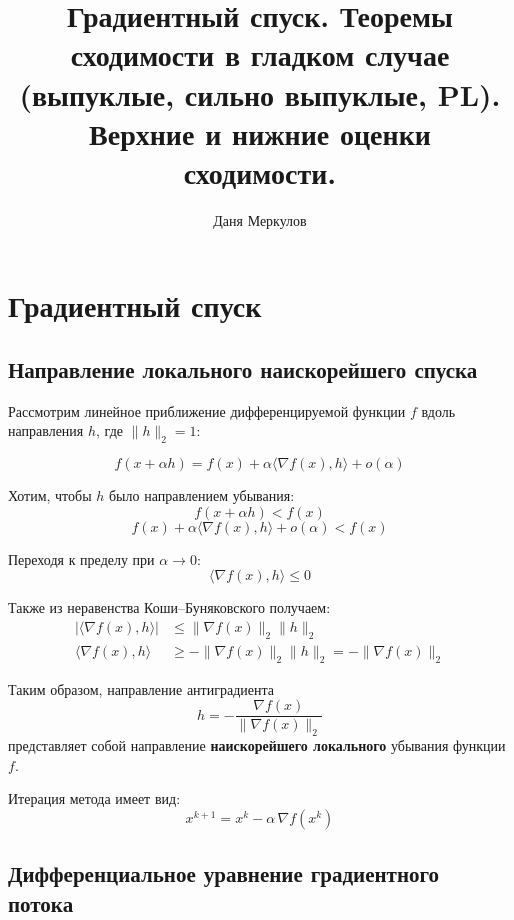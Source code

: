 \documentclass[
  russian,
  letterpaper,
  DIV=11,
  numbers=noendperiod]{scrartcl}
\title{Градиентный спуск. Теоремы сходимости в гладком случае (выпуклые,
сильно выпуклые, PL). Верхние и нижние оценки сходимости.}
\author{Даня Меркулов}
\date{}
\begin{document}
\maketitle


\section{Градиентный
спуск}\label{ux433ux440ux430ux434ux438ux435ux43dux442ux43dux44bux439-ux441ux43fux443ux441ux43a}

\subsection{Направление локального наискорейшего
спуска}\label{ux43dux430ux43fux440ux430ux432ux43bux435ux43dux438ux435-ux43bux43eux43aux430ux43bux44cux43dux43eux433ux43e-ux43dux430ux438ux441ux43aux43eux440ux435ux439ux448ux435ux433ux43e-ux441ux43fux443ux441ux43aux430}

Рассмотрим линейное приближение дифференцируемой функции \(f\) вдоль
направления \(h\), где \(\|h\|_2 = 1\):

\[
f(x + \alpha h) = f(x) + \alpha \langle \nabla f(x), h \rangle + o(\alpha)
\]

Хотим, чтобы \(h\) было направлением убывания: \[
f(x + \alpha h) < f(x)
\] \[
f(x) + \alpha \langle \nabla f(x), h \rangle + o(\alpha) < f(x)
\]

Переходя к пределу при \(\alpha \to 0\): \[
\langle \nabla f(x), h \rangle \leq 0
\]

Также из неравенства Коши--Буняковского получаем: \[
\begin{split}
|\langle \nabla f(x), h \rangle | &\leq \| \nabla f(x) \|_2 \| h \|_2 \\
\langle \nabla f(x), h \rangle &\geq -\| \nabla f(x) \|_2 \| h \|_2 = -\| \nabla f(x) \|_2
\end{split}
\]

Таким образом, направление антиградиента \[
h = -\dfrac{\nabla f(x)}{\|\nabla f(x)\|_2}
\] представляет собой направление \textbf{наискорейшего локального}
убывания функции \(f\).

Итерация метода имеет вид: \[
x^{k+1} = x^k - \alpha \, \nabla f(x^k)
\]

\subsection{Дифференциальное уравнение градиентного
потока}\label{ux434ux438ux444ux444ux435ux440ux435ux43dux446ux438ux430ux43bux44cux43dux43eux435-ux443ux440ux430ux432ux43dux435ux43dux438ux435-ux433ux440ux430ux434ux438ux435ux43dux442ux43dux43eux433ux43e-ux43fux43eux442ux43eux43aux430}
\end{document}
